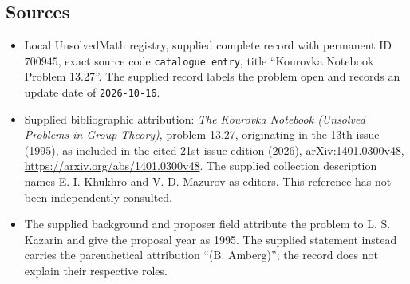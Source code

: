 \documentclass[11pt]{article}
\begin{document}
\subsection{Sources}
\begin{itemize}
\item Local UnsolvedMath registry, supplied complete record with permanent ID \(700945\), exact source code \texttt{catalogue entry}, title ``Kourovka Notebook Problem 13.27''. The supplied record labels the problem open and records an update date of \texttt{2026-10-16}.
\item Supplied bibliographic attribution: \emph{The Kourovka Notebook (Unsolved Problems in Group Theory)}, problem 13.27, originating in the 13th issue (1995), as included in the cited 21st issue edition (2026), arXiv:1401.0300v48, \url{https://arxiv.org/abs/1401.0300v48}. The supplied collection description names E. I. Khukhro and V. D. Mazurov as editors. This reference has not been independently consulted.
\item The supplied background and proposer field attribute the problem to L. S. Kazarin and give the proposal year as 1995. The supplied statement instead carries the parenthetical attribution ``(B. Amberg)''; the record does not explain their respective roles.
\end{itemize}
\end{document}
